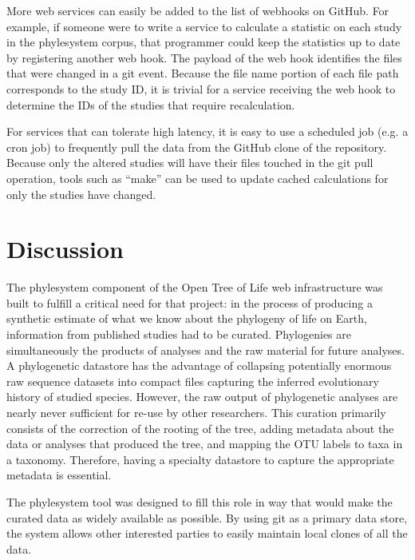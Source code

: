 \documentclass{bioinfo}
\newcommand{\ps}{phylesystem\xspace}
\newcommand{\otol}{Open Tree of Life\xspace}
\begin{document}
\begin{methods}
More web services can easily be added to the list of webhooks on GitHub.
For example, if someone were to write a service to calculate a statistic on each study in the \ps corpus, that
    programmer could keep the statistics up to date by registering another web hook.
The payload of the web hook identifies the files that were changed in a git event.
Because the file name portion of each file path corresponds to the study ID, it is trivial for a service
    receiving the web hook to determine the IDs of the studies that require recalculation.

For services that can tolerate high latency, it is easy to use a scheduled job (e.g. a cron job) to 
    frequently pull the data from the GitHub clone of the repository.
Because only the altered studies will have their files touched in the git pull operation, tools such
    as ``make'' can be used to update cached calculations for only the studies have changed.
\end{methods}

\section{Discussion}
The \ps component of the \otol web infrastructure was built to fulfill a critical need for that
    project: in the process of producing a synthetic estimate of what we know about the phylogeny
    of life on Earth, information from published studies had to be curated.
Phylogenies are simultaneously the products of analyses and the raw material for future analyses.
A phylogenetic datastore has the advantage of collapsing potentially enormous raw sequence datasets
  into compact files capturing the inferred evolutionary history of studied species.
However, the raw output of phylogenetic analyses are nearly never sufficient for re-use by other researchers. 
This curation primarily consists of the correction of the rooting of the tree, adding metadata about the data
    or analyses that produced the tree, and mapping the OTU labels to taxa in a taxonomy.
Therefore, having a specialty datastore to capture the appropriate metadata is essential.

The \ps tool was designed to fill this role in way that would make the curated data as widely available
    as possible.
By using git as a primary data store, the system allows other interested parties to easily maintain
    local clones of all the data.
\end{document}
